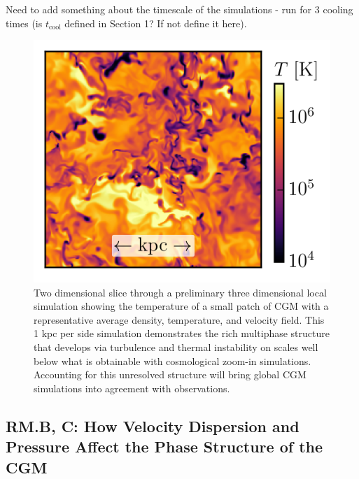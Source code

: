 \documentclass[11pt,letterpaper,english]{article}
\begin{document}
Need to add something about the timescale of the simulations - run for 3 cooling times (is $t_\mathrm{cool}$ defined in Section 1? If not define it here).

\begin{figure}[h]
    \centering
    \begin{minipage}{0.33\textwidth}
\caption{Two dimensional slice through a preliminary three dimensional local simulation showing the temperature of a small patch of CGM with a representative average density, temperature, and velocity field. This 1 kpc per side simulation demonstrates the rich multiphase structure that develops via turbulence and thermal instability on scales well below what is obtainable with cosmological zoom-in simulations. Accounting for this unresolved structure will bring global CGM simulations \cite{Fielding17} into agreement with observations. \label{fig:CGMpatch}}
    \end{minipage}\hfill
    \begin{minipage}{0.67\textwidth}
        \hspace{0.3cm} 
        \includegraphics[width=1.04\textwidth]{T_proposal.png} 
    \end{minipage}
\end{figure}


\vspace{-.25in}
\subsection{RM.B, C: How Velocity Dispersion and Pressure Affect the Phase Structure of the CGM}
\vspace{-.2in}
\end{document}
